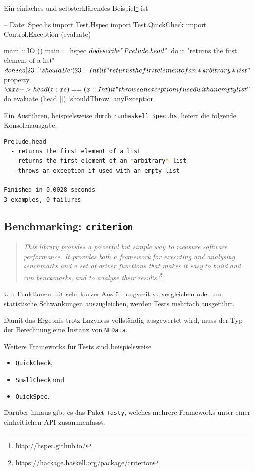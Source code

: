 Ein einfaches und selbsterklärendes
Beispiel\footnote{\url{http://hspec.github.io/}} ist
\begin{hcode}
-- Datei Spec.hs
import Test.Hspec
import Test.QuickCheck
import Control.Exception (evaluate)

main :: IO ()
main = hspec $ do
  describe "Prelude.head" $ do
    it "returns the first element of a list" $ do
      head [23 ..] `shouldBe` (23 :: Int)

    it "returns the first element of an *arbitrary* list" $
      property $ \x xs -> head (x:xs) == (x :: Int)

    it "throws an exception if used with an empty list" $ do
      evaluate (head []) `shouldThrow` anyException
\end{hcode}
Ein Ausführen, beispielsweise durch \texttt{runhaskell Spec.hs},
liefert die folgende Konsolenausgabe:
\begin{lstlisting}[language=bash 
                  ,numbers=none
                  ,frame=L]
Prelude.head
  - returns the first element of a list
  - returns the first element of an *arbitrary* list
  - throws an exception if used with an empty list

Finished in 0.0028 seconds
3 examples, 0 failures
\end{lstlisting}

\subsection{Benchmarking: \texttt{criterion}}
\begin{quote}\itshape
  This library provides a powerful but simple way to measure software
  performance. It provides both a framework for executing and analysing
  benchmarks and a set of driver functions that makes it easy to build and run
  benchmarks, and to analyse their
  results.\footnote{\url{https://hackage.haskell.org/package/criterion}}
\end{quote}
Um Funktionen mit sehr kurzer Ausführungszeit zu vergleichen oder um
statistische Schwankungen auszugleichen, werden Tests mehrfach ausgeführt.

Damit das Ergebnis trotz Lazyness vollständig ausgewertet wird, muss der Typ
der Berechnung eine Instanz von \texttt{NFData}.

Weitere Frameworks für Tests sind beispielsweise
\begin{itemize}
  \item \texttt{QuickCheck},
  \item \texttt{SmallCheck} und
  \item \texttt{QuickSpec}.
\end{itemize}
Darüber hinaus gibt es das Paket \texttt{Tasty}, welches mehrere Frameworks 
unter einer einheitlichen API zusammenfasst.

